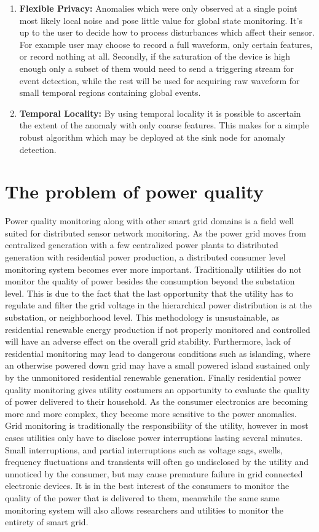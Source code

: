 \begin{enumerate}
	\item \textbf{Flexible Privacy:} Anomalies which were only observed at a single point most likely local noise and pose little value for global state monitoring. It's up to the user to decide how to process disturbances which affect their sensor. For example user may choose to record a full waveform, only certain features, or record nothing at all. Secondly, if the saturation of the device is high enough only a subset of them would need to send a triggering stream for event detection, while the rest will be used for acquiring raw waveform for small temporal regions containing global events. 
  \item \textbf{Temporal Locality:} By using temporal locality it is possible to ascertain the extent of the anomaly with only coarse features. This makes for a simple robust algorithm which may be deployed at the sink node for anomaly detection.
\end{enumerate}

\section{The problem of power quality}
Power quality monitoring along with other smart grid domains is a field well suited for distributed sensor network monitoring.\cite{liu2017distribution} \cite{peisert2017lbnl} As the power grid moves from centralized generation with a few centralized power plants to distributed generation with residential power production, a distributed  consumer level monitoring system becomes ever more important. Traditionally utilities do not monitor the quality of power besides the consumption beyond the substation level. This is due to the fact that the last opportunity that the utility has to regulate and filter the grid voltage in the hierarchical power distribution is at the substation, or neighborhood level. This methodology is unsustainable, as residential renewable energy production if not properly monitored and controlled will have an adverse effect on the overall grid stability. Furthermore, lack of residential monitoring may lead to dangerous conditions such as islanding, where an otherwise powered down grid may have a small powered island sustained only by the unmonitored residential renewable generation. Finally residential power quality monitoring gives utility costumers an opportunity to evaluate the quality of power delivered to their household. As the consumer electronics are becoming more and more complex, they become more sensitive to the power anomalies. Grid monitoring is traditionally the responsibility of the utility, however in most cases utilities only have to disclose power interruptions lasting several minutes. Small interruptions, and partial interruptions such as voltage sags, swells, frequency fluctuations and transients will often go undisclosed by the utility and unnoticed by the consumer, but may cause premature failure in grid connected electronic devices. It is in the best interest of the consumers to monitor the quality of the power that is delivered to them, meanwhile the same same monitoring system will also allows researchers and utilities to monitor the entirety of smart grid.

